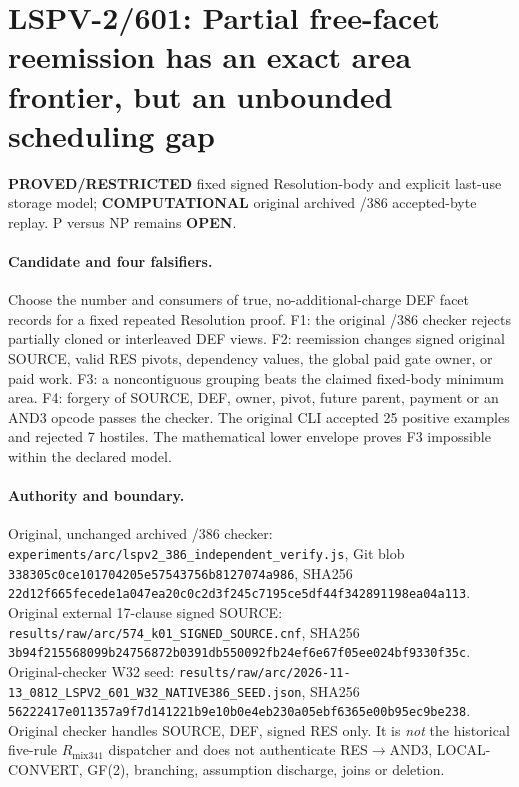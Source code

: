 \documentclass[11pt]{article}
\begin{document}
\section*{LSPV-2/601: Partial free-facet reemission has an exact area frontier, but an unbounded scheduling gap}
\noindent \textbf{PROVED/RESTRICTED} fixed signed Resolution-body and explicit last-use storage model; \textbf{COMPUTATIONAL} original archived /386 accepted-byte replay. P versus NP remains \textbf{OPEN}.

\paragraph{Candidate and four falsifiers.}
Choose the number and consumers of true, no-additional-charge DEF facet records for a fixed repeated Resolution proof. F1: the original /386 checker rejects partially cloned or interleaved DEF views. F2: reemission changes signed original SOURCE, valid RES pivots, dependency values, the global paid gate owner, or paid work. F3: a noncontiguous grouping beats the claimed fixed-body minimum area. F4: forgery of SOURCE, DEF, owner, pivot, future parent, payment or an AND3 opcode passes the checker. The original CLI accepted 25 positive examples and rejected 7 hostiles. The mathematical lower envelope proves F3 impossible within the declared model.

\paragraph{Authority and boundary.}
Original, unchanged archived /386 checker: \texttt{experiments/arc/lspv2\_386\_independent\_verify.js}, Git blob \texttt{338305c0ce101704205e57543756b8127074a986}, SHA256 \texttt{22d12f665fecede1a047ea20c0c2d3f245c7195ce5df44f342891198ea04a113}. Original external 17-clause signed SOURCE: \texttt{results/raw/arc/574\_k01\_SIGNED\_SOURCE.cnf}, SHA256 \texttt{3b94f215568099b24756872b0391db550092fb24ef6e67f05ee024bf9330f35c}. Original-checker W32 seed: \texttt{results/raw/arc/2026-11-13\_0812\_LSPV2\_601\_W32\_NATIVE386\_SEED.json}, SHA256 \texttt{56222417e011357a9f7d141221b9e10b0e4eb230a05ebf6365e00b95ec9be238}. Original checker handles SOURCE, DEF, signed RES only. It is \emph{not} the historical five-rule $R_{\mathrm{mix341}}$ dispatcher and does not authenticate RES$\to$AND3, LOCAL-CONVERT, GF(2), branching, assumption discharge, joins or deletion.
\end{document}
